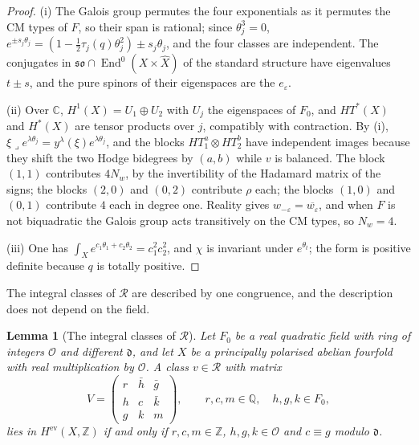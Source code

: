 \documentclass[11pt,reqno]{amsart}
\theoremstyle{plain}
\newtheorem{lemma}[theorem]{Lemma}
\theoremstyle{definition}
\theoremstyle{remark}
\newcommand{\QQ}{\mathbb{Q}}
\newcommand{\ZZ}{\mathbb{Z}}
\newcommand{\CC}{\mathbb{C}}
\newcommand{\cO}{\mathcal{O}}
\DeclareMathOperator{\End}{End}
\begin{document}
\begin{proof}
(i) The Galois group permutes the four exponentials as it permutes the CM
types of $F$, so their span is rational; since $\theta_{j}^{3}=0$,
$e^{\pm s_{j}\theta_{j}}=(1-\tfrac12\tau_{j}(q)\theta_{j}^{2})\pm s_{j}\theta_{j}$, and
the four classes are independent. The conjugates in
$\mathfrak{so}\cap\End^{0}(X\times\widehat X)$ of the standard structure have
eigenvalues $t\pm s$, and the pure spinors of their eigenspaces are the
$e_{\varepsilon}$.

(ii) Over $\CC$, $H^{1}(X)=U_{1}\oplus U_{2}$ with $U_{j}$ the
eigenspaces of $F_{0}$, and $HT^{*}(X)$ and $H^{*}(X)$ are tensor products over
$j$, compatibly with contraction. By (i),
$\xi\lrcorner e^{\lambda\theta_{j}}=y^{\lambda}(\xi)e^{\lambda\theta_{j}}$, and the
blocks $HT_{1}^{a}\otimes HT_{2}^{b}$ have independent images because they
shift the two Hodge bidegrees by $(a,b)$ while $v$ is balanced. The block
$(1,1)$ contributes $4N_{w}$, by the invertibility of the Hadamard matrix of
the signs; the blocks $(2,0)$ and $(0,2)$ contribute $\rho$ each; the blocks
$(1,0)$ and $(0,1)$ contribute $4$ each in degree one. Reality gives
$w_{-\varepsilon}=\overline{w_{\varepsilon}}$, and when $F$ is not biquadratic
the Galois group acts transitively on the CM types, so $N_{w}=4$.

(iii) One has
$\int_{X}e^{c_{1}\theta_{1}+c_{2}\theta_{2}}=c_{1}^{2}c_{2}^{2}$, and $\chi$ is
invariant under $e^{\theta_{t}}$; the form is positive definite because $q$ is
totally positive.
\end{proof}

The integral classes of $\mathcal{R}$ are described by one congruence, and
the description does not depend on the field.

\begin{lemma}[The integral classes of $\mathcal{R}$]\label{lem:quarticlattice}
Let $F_{0}$ be a real quadratic field with ring of integers $\cO$ and
different $\mathfrak d$, and let $X$ be a principally polarised abelian
fourfold with real multiplication by $\cO$. A class $v\in\mathcal{R}$ with
matrix
\[
  V=\begin{pmatrix}r&\bar h&\bar g\\ h&c&\bar k\\ g&k&m\end{pmatrix},
  \qquad r,c,m\in\QQ,\quad h,g,k\in F_{0},
\]
lies in $H^{\mathrm{ev}}(X,\ZZ)$ if and only if $r,c,m\in\ZZ$,
$h,g,k\in\cO$ and $c\equiv g$ modulo $\mathfrak d$.
\end{lemma}
\end{document}
